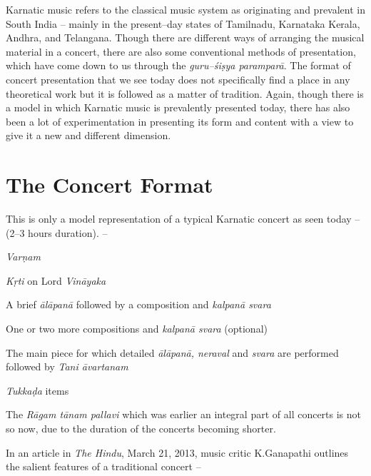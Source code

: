 Karnatic music refers to the classical music system as originating and prevalent in South India – mainly in the present–day states of Tamilnadu, Karnataka Kerala, Andhra, and Telangana. Though there are different ways of arranging the musical material in a concert, there are also some conventional methods of presentation, which have come down to us through the \textit{guru–śiṣya paramparā}. The format of concert presentation that we see today does not specifically find a place in any theoretical work but it is followed as a matter of tradition. Again, though there is a model in which Karnatic music is prevalently presented today, there has also been a lot of experimentation in presenting its form and content with a view to give it a new and different dimension.


\section*{The Concert Format}

This is only a model representation of a typical Karnatic concert as seen today – (2–3 hours duration). –

\textit{Varṇam}

\textit{Kṛti} on Lord \textit{Vināyaka}

A brief \textit{ālāpanā} followed by a composition and \textit{kalpanā svara}

One or two more compositions and \textit{kalpanā svara} (optional)

The main piece for which detailed \textit{ālāpanā, neraval} and \textit{svara} are performed followed by \textit{Tani āvartanam}

\textit{Tukkaḍa} items

The \textit{Rāgam tānam pallavi} which was earlier an integral part of all concerts is not so now, due to the duration of the concerts becoming shorter.

In an article in \textit{The Hindu}, March 21, 2013, music critic K.Ganapathi outlines the salient features of a traditional concert –


